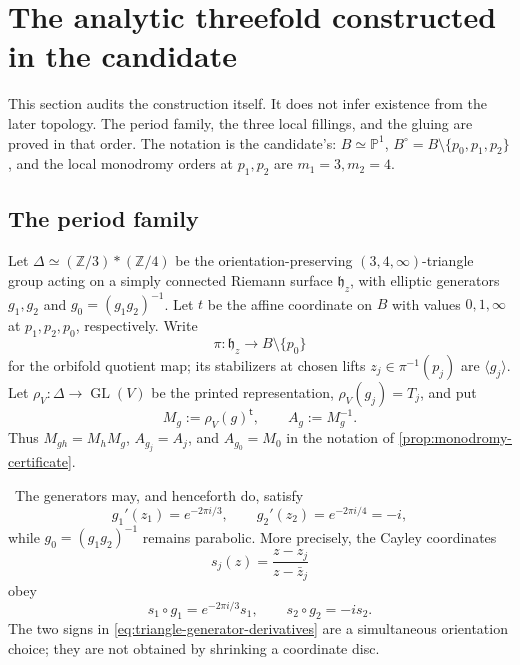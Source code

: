 \section{The analytic threefold constructed in the candidate}
\label{sec:candidate-geometry}

This section audits the construction itself.  It does not infer existence
from the later topology.  The period family, the three local fillings, and
the gluing are proved in that order.  The notation is the candidate's:
\(B\simeq\mathbb P^1\),
\(B^\circ=B\setminus\{p_0,p_1,p_2\}\), and the local monodromy orders at
\(p_1,p_2\) are \(m_1=3,m_2=4\).

\subsection{The period family}

Let \(\Delta\simeq(\mathbb Z/3)*(\mathbb Z/4)\) be the orientation-preserving
\((3,4,\infty)\)-triangle group acting on a simply connected Riemann surface
\(\mathfrak h_z\), with elliptic generators \(g_1,g_2\) and
\(g_0=(g_1g_2)^{-1}\).  Let \(t\) be the affine coordinate on
\(B\) with values \(0,1,\infty\) at \(p_1,p_2,p_0\), respectively.
Write
\[
 \pi:\mathfrak h_z\longrightarrow B\setminus\{p_0\}
\]
for the orbifold quotient map; its stabilizers at chosen lifts
\(z_j\in\pi^{-1}(p_j)\) are \(\langle g_j\rangle\).  Let
\(\rho_V:\Delta\to\operatorname{GL}(V)\) be the printed representation,
\(\rho_V(g_j)=T_j\), and put
\[
 M_g:=\rho_V(g)^{\mathsf t},\qquad A_g:=M_g^{-1}.
\]
Thus \(M_{gh}=M_hM_g\), \(A_{g_j}=A_j\), and
\(A_{g_0}=M_0\) in the notation of \cref{prop:monodromy-certificate}.

\begin{lemma}
\label{lem:triangle-generator-orientations}
\Verified\ The generators may, and henceforth do, satisfy
\begin{equation}
 g_1'(z_1)=e^{-2\pi i/3},\qquad
 g_2'(z_2)=e^{-2\pi i/4}=-i,
\label{eq:triangle-generator-derivatives}
\end{equation}
while \(g_0=(g_1g_2)^{-1}\) remains parabolic.  More precisely, the Cayley
coordinates
\begin{equation}
 s_j(z)=\frac{z-z_j}{z-\bar z_j}
\label{eq:triangle-cayley-coordinates}
\end{equation}
obey
\begin{equation}
 s_1\circ g_1=e^{-2\pi i/3}s_1,
 \qquad
 s_2\circ g_2=-is_2.
\label{eq:triangle-linearizing-identities}
\end{equation}
The two signs in \cref{eq:triangle-generator-derivatives} are a simultaneous
orientation choice; they are not obtained by shrinking a coordinate disc.
\end{lemma}

